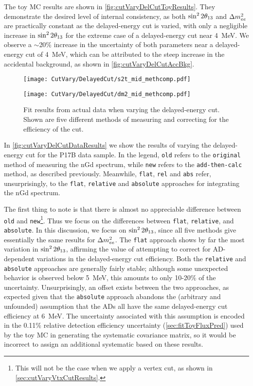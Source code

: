 \documentclass[../thesis.tex]{subfiles}
\begin{document}
The toy MC results are shown in \autoref{fig:cutVaryDelCutToyResults}. They demonstrate the desired level of internal consistency, as both $\sin^2 2\theta_{13}$ and $\Delta m^2_{ee}$ are practically constant as the delayed-energy cut is varied, with only a negligible increase in $\sin^2 2\theta_{13}$ for the extreme case of a delayed-energy cut near 4~MeV. We observe a $\sim$20\% increase in the uncertainty of both parameters near a delayed-energy cut of 4~MeV, which can be attributed to the steep increase in the accidental background, as shown in \autoref{fig:cutVaryDelCutAccBkg}.

\begin{figure}[ht]
  \begin{minipage}{0.5\linewidth}%
    \texttt{[image: CutVary/DelayedCut/s2t\_mid\_methcomp.pdf]}%
  \end{minipage}%
  \begin{minipage}{0.5\linewidth}%
    \texttt{[image: CutVary/DelayedCut/dm2\_mid\_methcomp.pdf]}%
  \end{minipage}%
  \caption{Fit results from actual data when varying the delayed-energy cut. Shown are five different methods of measuring and correcting for the efficiency of the cut.}
  \label{fig:cutVaryDelCutDataResults}
\end{figure}

In \autoref{fig:cutVaryDelCutDataResults} we show the results of varying the delayed-energy cut for the P17B data sample. In the legend, \texttt{old} refers to the \texttt{original} method of measuring the nGd spectrum, while \texttt{new} refers to the \texttt{add-then-calc} method, as described previously. Meanwhile, \texttt{flat}, \texttt{rel} and \texttt{abs} refer, unsurprisingly, to the \texttt{flat}, \texttt{relative} and \texttt{absolute} approaches for integrating the nGd spectrum.

The first thing to note is that there is almost no appreciable difference between \texttt{old} and \texttt{new}\footnote{This will not be the case when we apply a vertex cut, as shown in \autoref{sec:cutVaryVtxCutResults}.}. Thus we focus on the differences between \texttt{flat}, \texttt{relative}, and \texttt{absolute}. In this discussion, we focus on $\sin^2 2\theta_{13}$, since all five methods give essentially the same results for $\Delta m^2_{ee}$. The \texttt{flat} approach shows by far the most variation in $\sin^2 2\theta_{13}$, affirming the value of attempting to correct for AD-dependent variations in the delayed-energy cut efficiency. Both the \texttt{relative} and \texttt{absolute} approaches are generally fairly stable; although some unexpected behavior is observed below 5~MeV, this amounts to only 10-20\% of the uncertainty. Unsurprisingly, an offset exists between the two approaches, as expected given that the \texttt{absolute} approach abandons the (arbitrary and unfounded) assumption that the ADs all have the same delayed-energy cut efficiency at 6~MeV. The uncertainty associated with this assumption is encoded in the 0.11\% relative detection efficiency uncertainty (\autoref{sec:fitToyFluxPred}) used by the toy MC in generating the systematic covariance matrix, so it would be incorrect to assign an additional systematic based on these results.
\end{document}
